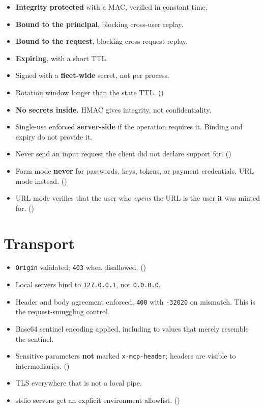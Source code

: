 \begin{itemize}[leftmargin=1.6em, itemsep=3pt]
\item[$\square$] \textbf{Integrity protected} with a MAC, verified in constant
time.
\item[$\square$] \textbf{Bound to the principal}, blocking cross-user replay.
\item[$\square$] \textbf{Bound to the request}, blocking cross-request replay.
\item[$\square$] \textbf{Expiring}, with a short TTL.
\item[$\square$] Signed with a \textbf{fleet-wide} secret, not per process.
\item[$\square$] Rotation window longer than the state TTL.
()
\item[$\square$] \textbf{No secrets inside.} HMAC gives integrity, not
confidentiality.
\item[$\square$] Single-use enforced \textbf{server-side} if the operation
requires it. Binding and expiry do not provide it.
\item[$\square$] Never send an input request the client did not declare support
for. ()
\item[$\square$] Form mode \textbf{never} for passwords, keys, tokens, or payment
credentials. URL mode instead. ()
\item[$\square$] URL mode verifies that the user who \emph{opens} the URL is the
user it was minted for. ()
\end{itemize}

\section{Transport}

\begin{itemize}[leftmargin=1.6em, itemsep=3pt]
\item[$\square$] \texttt{Origin} validated; \texttt{403} when disallowed.
()
\item[$\square$] Local servers bind to \texttt{127.0.0.1}, not
\texttt{0.0.0.0}.
\item[$\square$] Header and body agreement enforced, \texttt{400} with
\texttt{-32020} on mismatch. This is the request-smuggling control.
\item[$\square$] Base64 sentinel encoding applied, including to values that
merely resemble the sentinel.
\item[$\square$] Sensitive parameters \textbf{not} marked \texttt{x-mcp-header};
headers are visible to intermediaries. ()
\item[$\square$] TLS everywhere that is not a local pipe.
\item[$\square$] stdio servers get an explicit environment allowlist.
()
\end{itemize}

